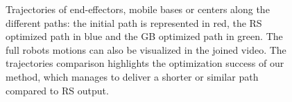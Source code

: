 \documentclass{tADR2e}
\begin{document}
\begin{figure}
{		\label{fig:trajectories:kitchen1}
	}
  \caption{Trajectories of end-effectors, mobile bases or centers along the 
  different paths: the initial path is represented in red, the RS optimized path in 
  blue and the GB optimized path in green. The full robots 
  motions can also be visualized in the joined video. The trajectories comparison 
  highlights the optimization success of our method, which manages to deliver a 
  shorter or similar path compared to RS output.}
  \label{fig:trajectories}
\end{figure}
\end{document}
